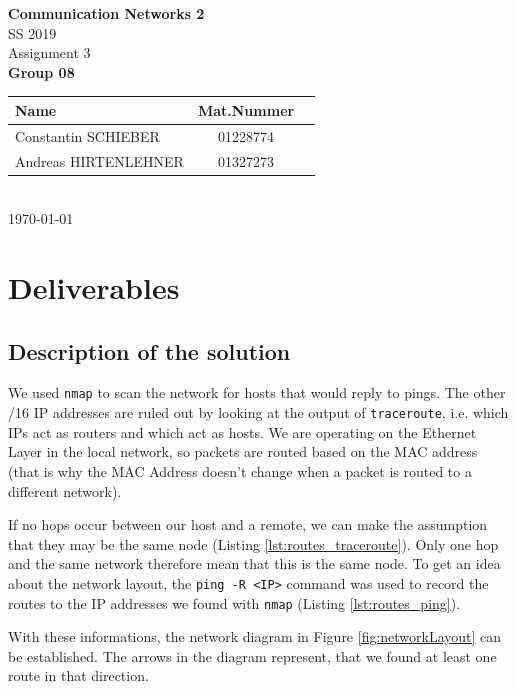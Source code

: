 \documentclass[parskip=full]{scrartcl}
\begin{document}
\begin{titlepage}
    \centering
    \vspace*{2cm}
    {\Huge \textbf{Communication Networks 2}}\\
    SS 2019\\
    \vspace*{1cm}
    {\Large Assignment 3}
    \\\vspace*{3cm}
    {\Large \textbf{Group 08}}\\
    \vspace*{1cm}
    {\large 
        \begin{tabular}{l c c}
            Name & Mat.Nummer \\ \hline
            Constantin SCHIEBER & 01228774 \\
            Andreas HIRTENLEHNER & 01327273
        \end{tabular}
    }
    \\\vspace*{7cm}
    \today
\end{titlepage}

\section{Deliverables}

\subsection{Description of the solution}
We used \texttt{nmap} to scan the network for hosts that would reply to pings. 
The other /16 IP addresses are ruled out by looking at the output of \texttt{traceroute}, i.e. which IPs act as routers and which act as hosts.
We are operating on the Ethernet Layer in the local network, so packets are routed based on the MAC address (that is why the MAC Address doesn't change when a packet is routed to a different network).

If no hops occur between our host and a remote, we can make the assumption that they may be the same node (Listing \ref{lst:routes_traceroute}).
Only one hop and the same network therefore mean that this is the same node.
To get an idea about the network layout, the \texttt{ping -R <IP>} command was used to record the routes to the IP addresses we found with \texttt{nmap} (Listing \ref{lst:routes_ping}).

With these informations, the network diagram in Figure \ref{fig:networkLayout} can be established. The arrows in the diagram represent, that we found at least one route in that direction. 
\end{document}
